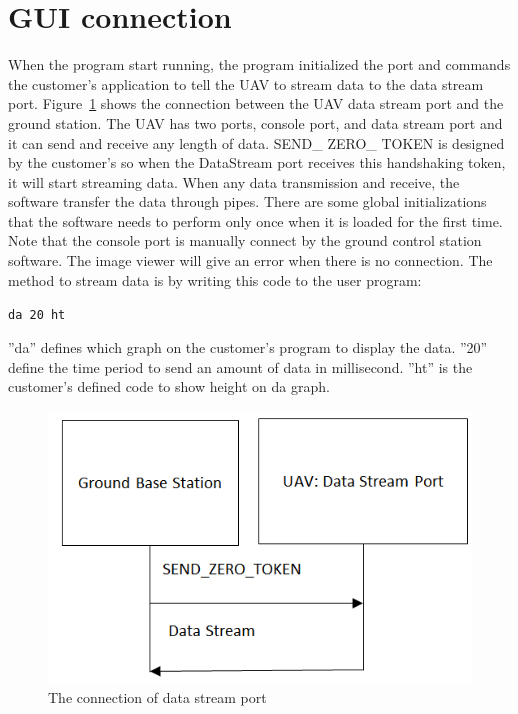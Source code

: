 \section{GUI connection}
 When the program start running, the program initialized the port and commands the customer’s application to tell the UAV to stream data to the data stream port. Figure~\ref{GCS_connect_command} shows the connection between the UAV data stream port and the ground station. The UAV has two ports, console port, and data stream port and it can send and receive any length of data. SEND\_ ZERO\_ TOKEN is designed by the customer’s so when the DataStream port receives this handshaking token, it will start streaming data. When any data transmission and receive, the software transfer the data through pipes. There are some global initializations that the software needs to perform only once when it is loaded for the first time. Note that the console port is manually connect by the ground control station software. The image viewer will give an error when there is no connection.
 The method to stream data is by writing this code to the user program:
 
\begin{center}
\texttt{da 20 ht}
\end{center}

''da'' defines which graph on the customer's program to display the data. ''20'' define the time period to send an amount of data in millisecond. ''ht'' is the customer's defined code to show height on da graph. 



\begin{figure}[!hbtp]
\begin{center}
\includegraphics[scale=0.5]{figures/connect_command.png} 
\end{center}
\caption{The connection of data stream port\label{GCS_connect_command}}
\end{figure}


